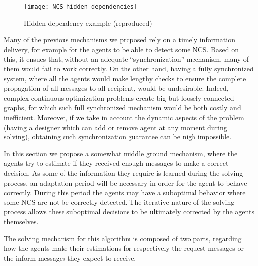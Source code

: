 \begin{figure}
\centering
\texttt{[image: NCS\_hidden\_dependencies]}
\caption{Hidden dependency example (reproduced)}\label{NCS_async_requests}
\end{figure}

Many of the previous mechanisms we proposed rely on a timely information delivery, for example for the agents to be able to detect some NCS. Based on this, it ensues that, without an adequate \enquote{synchronization} mechanism, many of them would fail to work correctly. On the other hand, having a fully synchronized system, where all the agents would make lengthy checks to ensure the complete propagation of all messages to all recipient, would be undesirable. Indeed, complex continuous optimization problems create big but loosely connected graphs, for which such full synchronized mechanism would be both costly and inefficient. Moreover, if we take in account the dynamic aspects of the problem (having a designer which can add or remove agent at any moment during solving), obtaining such synchronization guarantee can be nigh impossible.

In this section we propose a somewhat middle ground mechanism, where the agents try to estimate if they received enough messages to make a correct decision. As some of the information they require is learned during the solving process, an adaptation period will be necessary in order for the agent to behave correctly. During this period the agents may have a suboptimal behavior where some NCS are not be correctly detected. The iterative nature of the solving process allows these suboptimal decisions to be ultimately corrected by the agents themselves.

The solving mechanism for this algorithm is composed of two parts, regarding how the agents make their estimations for respectively the request messages or the inform messages they expect to receive.

